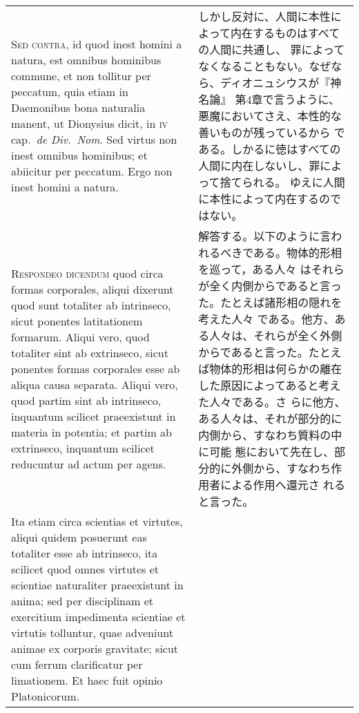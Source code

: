 \documentclass[10pt]{jsarticle}
\begin{document}
\begin{longtable}{p{21em}p{21em}}
 
\\



{\scshape Sed contra}, id quod inest homini a natura, est omnibus
hominibus commune, et non tollitur per peccatum, quia etiam in
Daemonibus bona naturalia manent, ut Dionysius dicit, in {\scshape iv}
cap.~{\itshape de Div.~Nom}. Sed virtus non inest omnibus hominibus;
et abiicitur per peccatum. Ergo non inest homini a natura.


&

 しかし反対に、人間に本性によって内在するものはすべての人間に共通し、
 罪によってなくなることもない。なぜなら、ディオニュシウスが『神名論』
 第4章で言うように、悪魔においてさえ、本性的な善いものが残っているから
 である。しかるに徳はすべての人間に内在しないし、罪によって捨てられる。
 ゆえに人間に本性によって内在するのではない。

 
\\



 {\scshape Respondeo dicendum} quod circa formas corporales, aliqui
 dixerunt quod sunt totaliter ab intrinseco, sicut ponentes
 latitationem formarum. Aliqui vero, quod totaliter sint ab
 extrinseco, sicut ponentes formas corporales esse ab aliqua causa
 separata. Aliqui vero, quod partim sint ab intrinseco, inquantum
 scilicet praeexistunt in materia in potentia; et partim ab
 extrinseco, inquantum scilicet reducuntur ad actum per agens.


&

 解答する。以下のように言われるべきである。物体的形相を巡って，ある人々
 はそれらが全く内側からであると言った。たとえば諸形相の隠れを考えた人々
 である。他方、ある人々は、それらが全く外側からであると言った。たとえ
 ば物体的形相は何らかの離在した原因によってあると考えた人々である。さ
 らに他方、ある人々は、それが部分的に内側から、すなわち質料の中に可能
 態において先在し、部分的に外側から、すなわち作用者による作用へ還元さ
 れると言った。

 
\\



 Ita etiam circa scientias et virtutes, aliqui quidem posuerunt eas
 totaliter esse ab intrinseco, ita scilicet quod omnes virtutes et
 scientiae naturaliter praeexistunt in anima; sed per disciplinam et
 exercitium impedimenta scientiae et virtutis tolluntur, quae
 adveniunt animae ex corporis gravitate; sicut cum ferrum clarificatur
 per limationem. Et haec fuit opinio Platonicorum.



\end{longtable}
\end{document}
